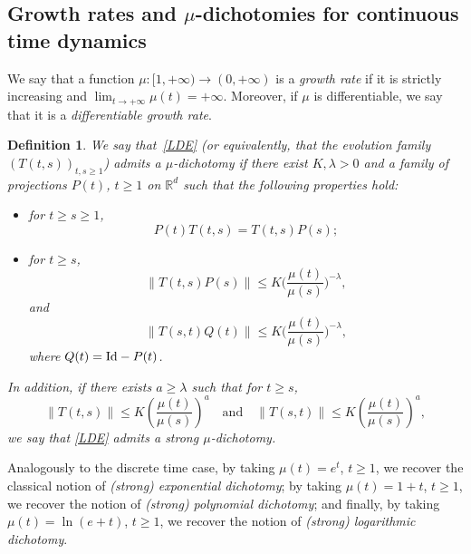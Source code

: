 \documentclass[reqno, a4paper, 10pt]{amsart}
\theoremstyle{plain}
\numberwithin{equation}{section}
\newtheorem{definition}{Definition}
\theoremstyle{remark}
\def\R{\mathbb{R}}
\def\Id{\text{\rm Id}}
\begin{document}
\subsection{Growth rates and $\mu$-dichotomies for continuous time dynamics} We say that a function $\mu\colon [1,+\infty)\to (0,+\infty)$ is a \emph{growth rate} if it is strictly increasing and $\lim_{t\to +\infty}\mu(t)=+\infty$. Moreover, if $\mu$ is differentiable, we say that it is a \emph{differentiable growth rate}.



\begin{definition}\label{def: nonunif pol dich continuous}
We say that~\eqref{LDE} (or equivalently, that the evolution family $(T(t,s))_{t,s\geq 1}$) admits a \emph{$\mu$-dichotomy} if there exist $K,\lambda>0$ and a family of projections $P(t)$, $t\ge 1$ on $\R^d$ such that the following properties hold:
\begin{itemize}
\item  for $t\ge s\ge 1$,
\begin{equation}\label{Pro}
P(t)T(t,s)=T(t,s)P(s);
\end{equation}
\item for $t\ge  s$,
\begin{equation}\label{B1}
\| T(t,s)P(s)\| \le K \bigg (\frac{\mu(t)}{\mu(s)}\bigg )^{-\lambda},
\end{equation}
and 
\begin{equation}\label{B2}
\|T(s,t)Q(t)\| \le K \bigg (\frac{\mu(t)}{\mu(s)}\bigg )^{-\lambda},
\end{equation}
where $Q(t)=\Id-P(t)$.
\end{itemize}
In addition, if there exists $a\geq \lambda$ such that for $t\ge s$,
\begin{equation}\label{bnd}
\| T(t,s)\| \le K\left(\frac{\mu(t)}{\mu(s)} \right)^a \quad \text{and} \quad \| T(s,t)\| \le K \left(\frac{\mu(t)}{\mu(s)}\right)^a,
\end{equation}
we say that \eqref{LDE} admits a \emph{strong $\mu$-dichotomy}.
\end{definition}
Analogously to the discrete time case, by taking $\mu(t)=e^t$, $t\geq 1$, we recover the classical notion of \emph{(strong) exponential dichotomy}; by taking $\mu(t)=1+t$, $t\geq 1$, we recover the notion of \emph{(strong) polynomial dichotomy}; and finally, by taking $\mu(t)=\ln(e+t)$, $t\geq 1$, we recover the notion of \emph{(strong) logarithmic dichotomy}.
\end{document}
